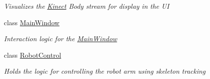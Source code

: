 \begin{DoxyCompactItemize}
\begin{DoxyCompactList}\small\item\em Visualizes the \hyperlink{namespace_microsoft_1_1_samples_1_1_kinect}{Kinect} Body stream for display in the UI \end{DoxyCompactList}\item 
class \hyperlink{class_microsoft_1_1_samples_1_1_kinect_1_1_kinect_security_system_1_1_main_window}{Main\+Window}
\begin{DoxyCompactList}\small\item\em Interaction logic for the \hyperlink{class_microsoft_1_1_samples_1_1_kinect_1_1_kinect_security_system_1_1_main_window}{Main\+Window} \end{DoxyCompactList}\item 
class \hyperlink{class_microsoft_1_1_samples_1_1_kinect_1_1_kinect_security_system_1_1_robot_control}{Robot\+Control}
\begin{DoxyCompactList}\small\item\em Holds the logic for controlling the robot arm using skeleton tracking \end{DoxyCompactList}\end{DoxyCompactItemize}
